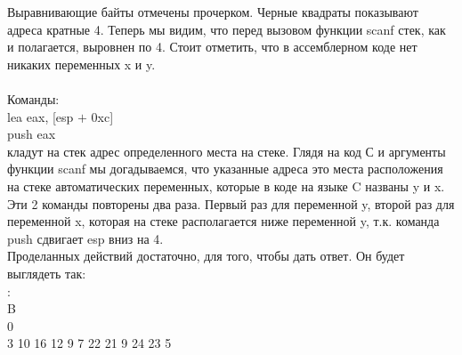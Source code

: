 \documentclass[12pt, letterpaper]{article}
\begin{document}
Выравнивающие байты отмечены прочерком. Черные квадраты показывают адреса кратные 4. Теперь мы видим, что перед вызовом функции scanf стек, как и полагается, выровнен по 4. Стоит отметить, что в ассемблерном коде нет никаких переменных x и y.\\ 
\\
Команды:\\
lea eax, [esp $+$ 0xc]\\
push eax\\
кладут на стек адрес определенного места на стеке. Глядя на код С и аргументы функции scanf мы догадываемся, что указанные адреса это места расположения на стеке автоматических переменных, которые в коде на языке C названы y и x. Эти 2 команды повторены два раза. Первый раз для переменной y, второй раз для переменной x, которая на стеке располагается ниже переменной y, т.к. команда push сдвигает esp вниз на 4.\\
Проделанных действий достаточно, для того, чтобы дать ответ. Он будет выглядеть так:\\

:\\
B\\
0\\
3 10 16 12 9 7 22 21 9 24 23 5
\newpage
\end{document}
